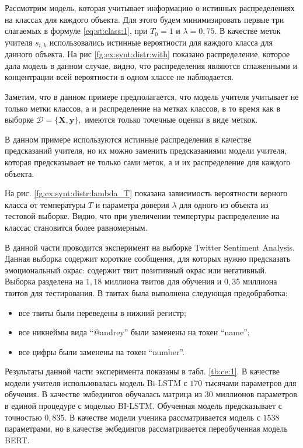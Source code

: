 Рассмотрим модель, которая учитывает информацию о истинных распределениях на классах для каждого объекта. Для этого будем минимизировать первые три слагаемых в формуле \eqref{eq:st:class:1}, при $T_0=1$ и $\lambda=0{,}75$. В качестве меток учителя $s_{i,k}$ использовались истинные вероятности для каждого класса для данного объекта. На рис \ref{fg:ex:synt:distr:with} показано распределение, которое дала модель в данном случае, видно, что распределения являются сглаженными и концентрации всей вероятности в одном классе не наблюдается.

Заметим, что в данном примере предполагается, что модель учителя учитывает не только метки классов, а и распределение на метках классов, в то время как в выборке $\mathcal{D} = \{\mathbf{X}, \mathbf{y}\},$ имеются только точечные оценки в виде меткок. 

В данном примере используются истинные распределения в качестве предсказаний учителя, но их можно заменить предсказаниями модели учителя, которая предсказывает не только сами меток, а и их распределение для каждого объекта.

На рис. \ref{fg:ex:synt:distr:lambda_T} показана зависимость вероятности верного класса от температуры $T$ и параметра доверия $\lambda$ для одного из объекта из тестовой выборке. Видно, что при увеличении темпертуры распределение на классас становится более равномерным.

В данной части проводится эксперимент на выборке Twitter Sentiment Analysis. Данная выборка содержит короткие сообщения, для которых нужно предсказать эмоциональный окрас: содержит твит позитивный окрас или негативный. Выборка разделена на $1{,}18$ миллиона твитов для обучения и $0{,}35$ миллиона твитов для тестирования. В твитах была выполнена следующая предобработка:
\begin{itemize}
	\item все твиты были переведены в нижний регистр;
	\item все никнеймы вида ``@andrey'' были заменены на токен ``name'';
	\item все цифры были заменены на токен ``number''.
\end{itemize}
Результаты данной части эксперимента показаны в табл. \ref{tb:ce:1}. В качестве модели учителя использовалась модель Bi-LSTM с $170$ тысячами параметров для обучения. В качестве эмбедингов обучалась матрица из $30$ миллионов параметров в единой процедуре с моделью BI-LSTM. Обученная модель предсказывает с точностью $0{,}835$. В качестве модели ученика рассматривается модель с $1538$ параметрами, но в качестве эмбедингов рассматривается переобученная модель BERT.

